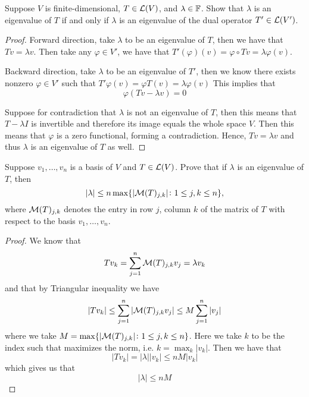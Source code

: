 \documentclass{extarticle}
\begin{document}
\begin{problem}{15}
    Suppose \(V\) is finite-dimensional, \(T \in \mathcal{L}(V)\), and \(\lambda \in \mathbb{F}\). Show that 
    \(\lambda\) is an eigenvalue of \(T\) if and only if \(\lambda\) is an eigenvalue of 
    the dual operator \(T' \in \mathcal{L}(V')\).
\end{problem}

\begin{proof}
Forward direction, take \(\lambda\) to be an eigenvalue of \(T\), then we have that \(Tv = \lambda v\). 
Then take any \(\varphi \in V'\), we have that \(T'(\varphi) (v)= \varphi \circ Tv 
= \lambda \varphi (v)\). 

Backward direction, take \(\lambda\) to be an eigenvalue of \(T'\), then we know there exists 
nonzero \(\varphi \in V'\) such that 
\(T' \varphi (v) = \varphi T(v) = \lambda \varphi (v)\) 
This implies that 
\[\varphi(Tv - \lambda v) = 0\]

Suppose for contradiction that \(\lambda\) is not an eigenvalue of \(T\), then this means that 
\(T - \lambda I\) is invertible and therefore its image equals the whole space \(V\). Then this 
means that \(\varphi\) is a zero functional, forming a contradiction. Hence, \(Tv = \lambda v\)
and thus \(\lambda\) is an eigenvalue of \(T\) as well. 

\end{proof}

\begin{problem}{16}
    Suppose \(v_1, \ldots, v_n\) is a basis of \(V\) and \(T \in \mathcal{L}(V)\). Prove that if 
    \(\lambda\) is an eigenvalue of \(T\), then 
    \[|\lambda| \leq n \max \{|\mathcal{M}(T)_{j,k}|\colon 1 \leq j,k \leq n\},\]
    where \(\mathcal{M}(T)_{j,k}\) denotes the entry in row \(j\), column \(k\) of the matrix of 
    \(T\) with respect to the basis \(v_1, \ldots, v_n\). 
\end{problem}

\begin{proof}
We know that 
\[T v_k = \sum_{j=1}^{n} \mathcal{M}(T)_{j, k} v_j = \lambda v_k\]
and that by Triangular inequality we have 
\[|Tv_k| \leq \sum_{j=1}^{n} |\mathcal{M}(T)_{j, k} v_j| \leq M \sum_{j=1}^{n} |v_j|\]
where we take \(M = \max \{|\mathcal{M}(T)_{j,k}|\colon 1 \leq j,k \leq n\}\). Here we take 
\(k\) to be the index such that maximizes the norm, i.e. \(k = \max_k |v_k|\). Then we have that 
\[|T v_k| = |\lambda| |v_k| \leq nM |v_k|\]
which gives us that 
\[|\lambda| \leq nM\]
\end{proof}
\end{document}
